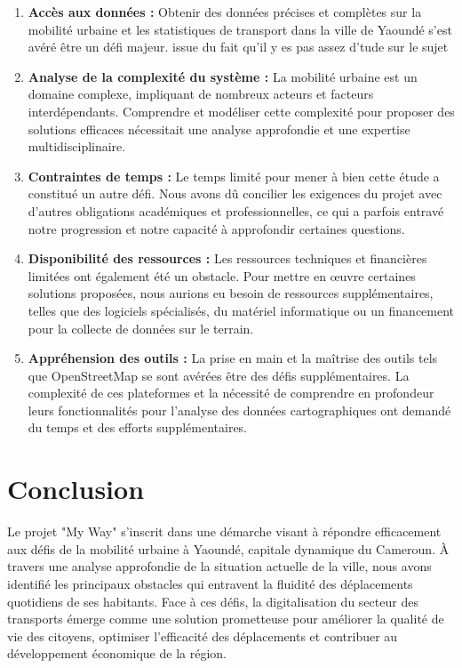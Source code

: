 \documentclass{article}
\begin{document}
\begin{enumerate}
    \item \textbf{Accès aux données :} Obtenir des données précises et complètes sur la mobilité urbaine et les statistiques de transport dans la ville de Yaoundé s'est avéré être un défi majeur. issue du fait qu'il y es pas assez d'tude sur le sujet
    
    \item \textbf{Analyse de la complexité du système :} La mobilité urbaine est un domaine complexe, impliquant de nombreux acteurs et facteurs interdépendants. Comprendre et modéliser cette complexité pour proposer des solutions efficaces nécessitait une analyse approfondie et une expertise multidisciplinaire.
    
    \item \textbf{Contraintes de temps :} Le temps limité pour mener à bien cette étude a constitué un autre défi. Nous avons dû concilier les exigences du projet avec d'autres obligations académiques et professionnelles, ce qui a parfois entravé notre progression et notre capacité à approfondir certaines questions.
    
    \item \textbf{Disponibilité des ressources :} Les ressources techniques et financières limitées ont également été un obstacle. Pour mettre en œuvre certaines solutions proposées, nous aurions eu besoin de ressources supplémentaires, telles que des logiciels spécialisés, du matériel informatique ou un financement pour la collecte de données sur le terrain.
    
    \item \textbf{Appréhension des outils :} La prise en main et la maîtrise des outils tels que OpenStreetMap se sont avérées être des défis supplémentaires. La complexité de ces plateformes et la nécessité de comprendre en profondeur leurs fonctionnalités pour l'analyse des données cartographiques ont demandé du temps et des efforts supplémentaires.
\end{enumerate}


\newpage

\section*{Conclusion}

Le projet "My Way" s'inscrit dans une démarche visant à répondre efficacement aux défis de la mobilité urbaine à Yaoundé, capitale dynamique du Cameroun. À travers une analyse approfondie de la situation actuelle de la ville, nous avons identifié les principaux obstacles qui entravent la fluidité des déplacements quotidiens de ses habitants. Face à ces défis, la digitalisation du secteur des transports émerge comme une solution prometteuse pour améliorer la qualité de vie des citoyens, optimiser l'efficacité des déplacements et contribuer au développement économique de la région.
\end{document}
